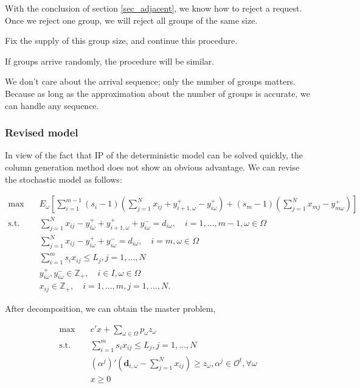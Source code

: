 With the conclusion of section \ref{sec_adjacent}, we know how to reject a request. Once we reject one group, we will reject all groups of the same size. 

Fix the supply of this group size, and continue this procedure.  

If groups arrive randomly, the procedure will be similar. 

We don't care about the arrival sequence; only the number of groups matters. Because as long as the approximation about the number of groups is accurate, we can handle any sequence.

\subsubsection{Revised model}

In view of the fact that IP of the deterministic model can be solved quickly, the column generation method does not show an obvious advantage. We can revise the stochastic model as follows:

\begin{equation}\label{revised_form}
  \begin{aligned}
  \max \quad & E_{\omega}\left[\sum_{i=1}^{m-1} (s_i-1) (\sum_{j= 1}^{N} x_{ij} + y_{i+1,\omega}^{+} - y_{i \omega}^{+}) + (s_m-1) (\sum_{j= 1}^{N} x_{mj} - y_{m \omega}^{+})\right] \\
  \text {s.t.} \quad & \sum_{j= 1}^{N} x_{ij}-y_{i \omega}^{+}+
  y_{i+1, \omega}^{+} + y_{i \omega}^{-}=d_{i \omega}, \quad i =1,\ldots,m-1, \omega \in \Omega \\
  & \sum_{j= 1}^{N} x_{ij} -y_{i \omega}^{+}+y_{i \omega}^{-}=d_{i \omega}, \quad i = m, \omega \in \Omega \\
  & \sum_{i=1}^{m} s_{i} x_{ij} \leq L_j, j =1,\ldots, N\\
  & y_{i \omega}^{+}, y_{i \omega}^{-} \in \mathbb{Z}_{+}, \quad i \in I, \omega \in \Omega \\
  & x_{ij} \in \mathbb{Z}_{+}, \quad i=1,\ldots,m, j =1,\ldots,N.
  \end{aligned}
\end{equation}

After decomposition, we can obtain the master problem,

\begin{equation}\label{BD_revised}
  \begin{aligned}
    \max \quad & c{'} x + \sum_{\omega \in \Omega} p_{\omega} z_{\omega} \\
    \text {s.t.} \quad & \sum_{i = 1}^{m} s_i x_{ij} \leq L_{j}, j=1,\ldots,N \\
    & (\alpha^{j}){'}(\mathbf{d}_{i,\omega}- \sum_{j=1}^{N} x_{ij}) \geq z_{\omega}, \alpha^j \in \mathcal{O}^{t}, \forall \omega \\
     & x \geq 0
  \end{aligned}
\end{equation}

